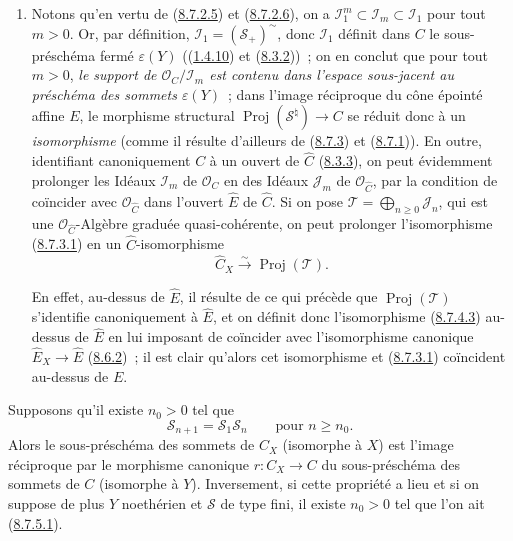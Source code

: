 \begin{remark}[8.7.4]
\begin{enumerate}
  \item[\rm{(ii)}] Notons qu'en vertu de
  (\hyperref[II.8.7.2.5-fr]{8.7.2.5}) et
  (\hyperref[II.8.7.2.6-fr]{8.7.2.6}), on a
  $\mathcal{I}_1^m\subset\mathcal{I}_m\subset\mathcal{I}_1$ pour tout $m>0$.
  Or, par définition, $\mathcal{I}_1=(\mathcal{S}_+)^{\sim}$, donc
  $\mathcal{I}_1$ définit dans $C$ le sous-préschéma fermé
  $\varepsilon(Y)$ ((\hyperref[II.1.4.10-fr]{1.4.10}) et
  (\hyperref[II.8.3.2-fr]{8.3.2}))~; on en conclut que pour tout $m>0$,
  \emph{le support de $\mathcal{O}_C/\mathcal{I}_m$ est contenu dans l'espace
  sous-jacent au préschéma des sommets $\varepsilon(Y)$}~; dans l'image
  réciproque du cône épointé affine $E$, le morphisme structural
  $\operatorname{Proj}(\mathcal{S}^{\natural})\to C$ se réduit donc à un
  \emph{isomorphisme} (comme il résulte d'ailleurs de
  (\hyperref[II.8.7.3-fr]{8.7.3}) et
  (\hyperref[II.8.7.1-fr]{8.7.1})). En outre, identifiant canoniquement $C$ à
  un ouvert de $\widehat{C}$ (\hyperref[II.8.3.3-fr]{8.3.3}), on peut
  évidemment prolonger les Idéaux $\mathcal{I}_m$ de $\mathcal{O}_C$ en des
  Idéaux $\mathcal{J}_m$ de $\mathcal{O}_{\widehat{C}}$, par la condition de
  coïncider avec $\mathcal{O}_{\widehat{C}}$ dans l'ouvert $\widehat{E}$ de
  $\widehat{C}$. Si on pose
  $\mathcal{T}=\bigoplus_{n\geqslant 0}\mathcal{J}_n$, qui est une
  $\mathcal{O}_{\widehat{C}}$-Algèbre graduée quasi-cohérente, on peut
  prolonger l'isomorphisme (\hyperref[II.8.7.3.1-fr]{8.7.3.1}) en un
  $\widehat{C}$-isomorphisme
  \begin{equation}
  \label{II.8.7.4.3-fr}
    \widehat{C}_X\xrightarrow{\sim}\operatorname{Proj}(\mathcal{T}).
  \tag{8.7.4.3}
  \end{equation}

  En effet, au-dessus de $\widehat{E}$, il résulte de ce qui précède que
  $\operatorname{Proj}(\mathcal{T})$ s'identifie canoniquement à
  $\widehat{E}$, et on définit donc l'isomorphisme
  (\hyperref[II.8.7.4.3-fr]{8.7.4.3}) au-dessus de $\widehat{E}$ en lui
  imposant de coïncider avec l'isomorphisme canonique
  $\widehat{E}_X\to\widehat{E}$ (\hyperref[II.8.6.2-fr]{8.6.2})~; il est clair
  qu'alors cet isomorphisme et (\hyperref[II.8.7.3.1-fr]{8.7.3.1}) coïncident
  au-dessus de $E$.
\end{enumerate}
\end{remark}

\begin{corollary}[8.7.5]
\label{II.8.7.5-fr}
Supposons qu'il existe $n_0>0$ tel que
\begin{equation}
\label{II.8.7.5.1-fr}
  \mathcal{S}_{n+1}=\mathcal{S}_1\mathcal{S}_n
  \qquad\text{pour }n\geqslant n_0.
\tag{8.7.5.1}
\end{equation}
Alors le sous-préschéma des sommets de $C_X$ (isomorphe à $X$) est l'image
réciproque par le morphisme canonique $r:C_X\to C$ du sous-préschéma des
sommets de $C$ (isomorphe à $Y$). Inversement, si cette propriété a lieu et
si on suppose de plus $Y$ noethérien et $\mathcal{S}$ de type fini, il existe
$n_0>0$ tel que l'on ait (\hyperref[II.8.7.5.1-fr]{8.7.5.1}).
\end{corollary}

